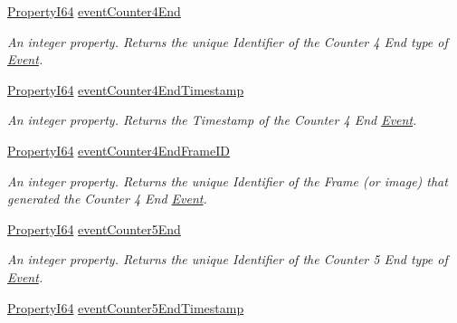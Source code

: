 \begin{DoxyCompactItemize}
\hyperlink{group___common_interface_ga81749b2696755513663492664a18a893}{Property\+I64} \hyperlink{classmv_i_m_p_a_c_t_1_1acquire_1_1_gen_i_cam_1_1_event_control_aae8e7390b8248d77357aabc29ff52c6f}{event\+Counter4\+End}
\begin{DoxyCompactList}\small\item\em An integer property. Returns the unique Identifier of the Counter 4 End type of \hyperlink{classmv_i_m_p_a_c_t_1_1acquire_1_1_event}{Event}. \end{DoxyCompactList}\item 
\hyperlink{group___common_interface_ga81749b2696755513663492664a18a893}{Property\+I64} \hyperlink{classmv_i_m_p_a_c_t_1_1acquire_1_1_gen_i_cam_1_1_event_control_a13aeefe7418708ccc1a03d48766598d9}{event\+Counter4\+End\+Timestamp}
\begin{DoxyCompactList}\small\item\em An integer property. Returns the Timestamp of the Counter 4 End \hyperlink{classmv_i_m_p_a_c_t_1_1acquire_1_1_event}{Event}. \end{DoxyCompactList}\item 
\hyperlink{group___common_interface_ga81749b2696755513663492664a18a893}{Property\+I64} \hyperlink{classmv_i_m_p_a_c_t_1_1acquire_1_1_gen_i_cam_1_1_event_control_a13f9ebd2ffb9e94cc0e4ad7ae4339bd2}{event\+Counter4\+End\+Frame\+I\+D}
\begin{DoxyCompactList}\small\item\em An integer property. Returns the unique Identifier of the Frame (or image) that generated the Counter 4 End \hyperlink{classmv_i_m_p_a_c_t_1_1acquire_1_1_event}{Event}. \end{DoxyCompactList}\item 
\hyperlink{group___common_interface_ga81749b2696755513663492664a18a893}{Property\+I64} \hyperlink{classmv_i_m_p_a_c_t_1_1acquire_1_1_gen_i_cam_1_1_event_control_ae0adafbbc307d6e7e86739432ad0d582}{event\+Counter5\+End}
\begin{DoxyCompactList}\small\item\em An integer property. Returns the unique Identifier of the Counter 5 End type of \hyperlink{classmv_i_m_p_a_c_t_1_1acquire_1_1_event}{Event}. \end{DoxyCompactList}\item 
\hyperlink{group___common_interface_ga81749b2696755513663492664a18a893}{Property\+I64} \hyperlink{classmv_i_m_p_a_c_t_1_1acquire_1_1_gen_i_cam_1_1_event_control_a7af13f09f4364840172f713326e1d78f}{event\+Counter5\+End\+Timestamp}

\end{DoxyCompactItemize}
